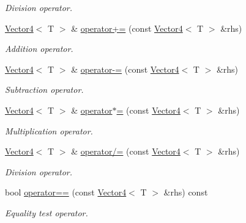 \begin{DoxyCompactItemize}
\begin{DoxyCompactList}\small\item\em Division operator. \item\end{DoxyCompactList}\item 
\hyperlink{class_vector4}{Vector4}$<$ T $>$ \& \hyperlink{class_vector4_abfa5fdfbc2f9569e467e05dd2ecaab26}{operator+=} (const \hyperlink{class_vector4}{Vector4}$<$ T $>$ \&rhs)
\begin{DoxyCompactList}\small\item\em Addition operator. \item\end{DoxyCompactList}\item 
\hyperlink{class_vector4}{Vector4}$<$ T $>$ \& \hyperlink{class_vector4_ad5cfb4045ea0305610179c6bae648520}{operator-\/=} (const \hyperlink{class_vector4}{Vector4}$<$ T $>$ \&rhs)
\begin{DoxyCompactList}\small\item\em Subtraction operator. \item\end{DoxyCompactList}\item 
\hyperlink{class_vector4}{Vector4}$<$ T $>$ \& \hyperlink{class_vector4_a3f5db01486e5265e137a112113cb6cf5}{operator$\ast$=} (const \hyperlink{class_vector4}{Vector4}$<$ T $>$ \&rhs)
\begin{DoxyCompactList}\small\item\em Multiplication operator. \item\end{DoxyCompactList}\item 
\hyperlink{class_vector4}{Vector4}$<$ T $>$ \& \hyperlink{class_vector4_a1dc992e52cfbd78bc502c644dc0521fe}{operator/=} (const \hyperlink{class_vector4}{Vector4}$<$ T $>$ \&rhs)
\begin{DoxyCompactList}\small\item\em Division operator. \item\end{DoxyCompactList}\item 
bool \hyperlink{class_vector4_a2e8f2ec10e407b1f3e731b62c03f8225}{operator==} (const \hyperlink{class_vector4}{Vector4}$<$ T $>$ \&rhs) const 
\begin{DoxyCompactList}\small\item\em Equality test operator. \item\end{DoxyCompactList}\item 

\end{DoxyCompactItemize}
